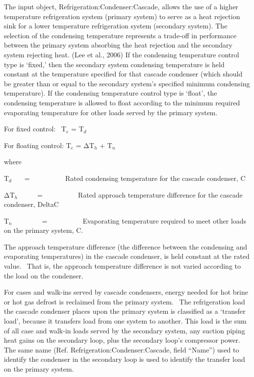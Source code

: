 The input object, Refrigeration:Condenser:Cascade, allows the use of a higher temperature refrigeration system (primary system) to serve as a heat rejection sink for a lower temperature refrigeration system (secondary system). The selection of the condensing temperature represents a trade-off in performance between the primary system absorbing the heat rejection and the secondary system rejecting heat. (Lee et al., 2006) If the condensing temperature control type is `fixed,' then the secondary system condensing temperature is held constant at the temperature specified for that cascade condenser (which should be greater than or equal to the secondary system's specified minimum condensing temperature). If the condensing temperature control type is `float', the condensing temperature is allowed to float according to the minimum required evaporating temperature for other loads served by the primary system.

For fixed control:~ T\(_{e}\) = T\(_{d}\)

For floating control: T\(_{e}\) = ΔT\(_{h}\) + T\(_{n}\)

where

T\(_{d}\)~~~ = ~~~~~~~~~ Rated condensing temperature for the cascade condenser, C

ΔT\(_{h}\)~~~~~ = ~~~~~~~~~ Rated approach temperature difference for the cascade condenser, DeltaC

T\(_{n}\)~~~~~~~~ = ~~~~~~~~~ Evaporating temperature required to meet other loads on the primary system, C.

The approach temperature difference (the difference between the condensing and evaporating temperatures) in the cascade condenser, is held constant at the rated value.~ That is, the approach temperature difference is not varied according to the load on the condenser.

For cases and walk-ins served by cascade condensers, energy needed for hot brine or hot gas defrost is reclaimed from the primary system.~ The refrigeration load the cascade condenser places upon the primary system is classified as a `transfer load', because it transfers load from one system to another. This load is the sum of all case and walk-in loads served by the secondary system, any suction piping heat gains on the secondary loop, plus the secondary loop's compressor power. The same name (Ref. Refrigeration:Condenser:Cascade, field ``Name'') used to identify the condenser in the secondary loop is used to identify the transfer load on the primary system.

